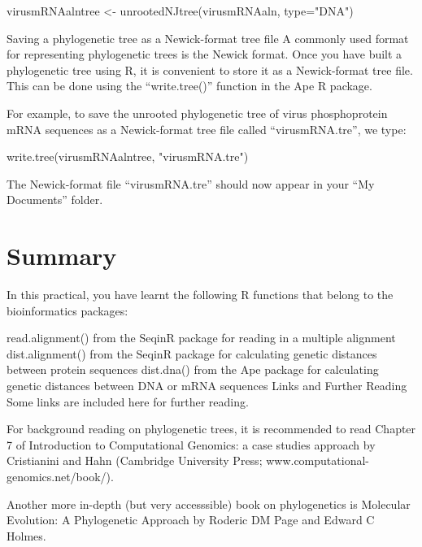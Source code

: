 \documentclass[
]{book}
\newenvironment{Shaded}{\begin{snugshade}}{\end{snugshade}}
\newcommand{\AttributeTok}[1]{\textcolor[rgb]{0.77,0.63,0.00}{#1}}
\newcommand{\FunctionTok}[1]{\textcolor[rgb]{0.00,0.00,0.00}{#1}}
\newcommand{\NormalTok}[1]{#1}
\newcommand{\OtherTok}[1]{\textcolor[rgb]{0.56,0.35,0.01}{#1}}
\newcommand{\StringTok}[1]{\textcolor[rgb]{0.31,0.60,0.02}{#1}}
\begin{document}
\begin{Shaded}
\begin{Highlighting}[]
\NormalTok{virusmRNAalntree }\OtherTok{\textless{}{-}} \FunctionTok{unrootedNJtree}\NormalTok{(virusmRNAaln, }\AttributeTok{type=}\StringTok{"DNA"}\NormalTok{)}
\end{Highlighting}
\end{Shaded}

Saving a phylogenetic tree as a Newick-format tree file
A commonly used format for representing phylogenetic trees is the Newick format. Once you have built a phylogenetic tree using R, it is convenient to store it as a Newick-format tree file. This can be done using the ``write.tree()'' function in the Ape R package.

For example, to save the unrooted phylogenetic tree of virus phosphoprotein mRNA sequences as a Newick-format tree file called ``virusmRNA.tre'', we type:

\begin{Shaded}
\begin{Highlighting}[]
\FunctionTok{write.tree}\NormalTok{(virusmRNAalntree, }\StringTok{"virusmRNA.tre"}\NormalTok{)}
\end{Highlighting}
\end{Shaded}

The Newick-format file ``virusmRNA.tre'' should now appear in your ``My Documents'' folder.

\hypertarget{summary-3}{%
\section{Summary}\label{summary-3}}

In this practical, you have learnt the following R functions that belong to the bioinformatics packages:

read.alignment() from the SeqinR package for reading in a multiple alignment
dist.alignment() from the SeqinR package for calculating genetic distances between protein sequences
dist.dna() from the Ape package for calculating genetic distances between DNA or mRNA sequences
Links and Further Reading
Some links are included here for further reading.

For background reading on phylogenetic trees, it is recommended to read Chapter 7 of Introduction to Computational Genomics: a case studies approach by Cristianini and Hahn (Cambridge University Press; www.computational-genomics.net/book/).

Another more in-depth (but very accesssible) book on phylogenetics is Molecular Evolution: A Phylogenetic Approach by Roderic DM Page and Edward C Holmes.
\end{document}

